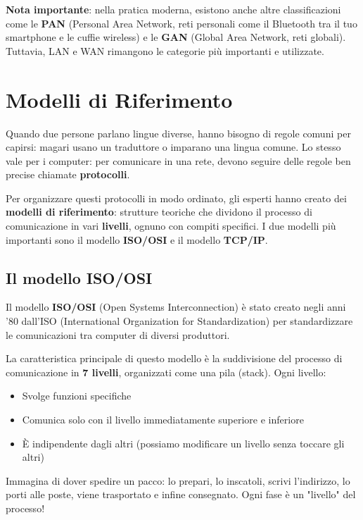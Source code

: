 \documentclass[12pt,a4paper]{article}
\begin{document}
\vspace{0.5cm}
\noindent
\textbf{Nota importante}: nella pratica moderna, esistono anche altre classificazioni come le \textbf{PAN} (Personal Area Network, reti personali come il Bluetooth tra il tuo smartphone e le cuffie wireless) e le \textbf{GAN} (Global Area Network, reti globali). Tuttavia, LAN e WAN rimangono le categorie più importanti e utilizzate.

\section{Modelli di Riferimento}

Quando due persone parlano lingue diverse, hanno bisogno di regole comuni per capirsi: magari usano un traduttore o imparano una lingua comune. Lo stesso vale per i computer: per comunicare in una rete, devono seguire delle regole ben precise chiamate \textbf{protocolli}.

Per organizzare questi protocolli in modo ordinato, gli esperti hanno creato dei \textbf{modelli di riferimento}: strutture teoriche che dividono il processo di comunicazione in vari \textbf{livelli}, ognuno con compiti specifici. I due modelli più importanti sono il modello \textbf{ISO/OSI} e il modello \textbf{TCP/IP}.

\subsection{Il modello ISO/OSI}

Il modello \textbf{ISO/OSI} (Open Systems Interconnection) è stato creato negli anni '80 dall'ISO (International Organization for Standardization) per standardizzare le comunicazioni tra computer di diversi produttori.

La caratteristica principale di questo modello è la suddivisione del processo di comunicazione in \textbf{7 livelli}, organizzati come una pila (stack). Ogni livello:
\begin{itemize}
    \item Svolge funzioni specifiche
    \item Comunica solo con il livello immediatamente superiore e inferiore
    \item È indipendente dagli altri (possiamo modificare un livello senza toccare gli altri)
\end{itemize}

Immagina di dover spedire un pacco: lo prepari, lo inscatoli, scrivi l'indirizzo, lo porti alle poste, viene trasportato e infine consegnato. Ogni fase è un "livello" del processo!
\end{document}
